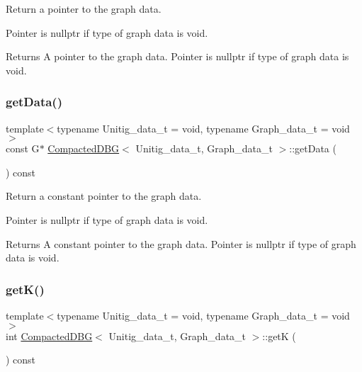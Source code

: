 Return a pointer to the graph data. 

Pointer is nullptr if type of graph data is void. \begin{DoxyReturn}{Returns}
A pointer to the graph data. Pointer is nullptr if type of graph data is void. 
\end{DoxyReturn}
\mbox{\label{classCompactedDBG_a36e0f2f8e4f46b4da147550a45bb4247}} 
\subsubsection{\texorpdfstring{get\+Data()}{getData()}\hspace{0.1cm}{\footnotesize\ttfamily [2/2]}}
{\footnotesize\ttfamily template$<$typename Unitig\+\_\+data\+\_\+t = void, typename Graph\+\_\+data\+\_\+t = void$>$ \\
const G$\ast$ \hyperlink{classCompactedDBG}{Compacted\+D\+BG}$<$ Unitig\+\_\+data\+\_\+t, Graph\+\_\+data\+\_\+t $>$\+::get\+Data (\begin{DoxyParamCaption}{ }\end{DoxyParamCaption}) const\hspace{0.3cm}{\ttfamily [inline]}}



Return a constant pointer to the graph data. 

Pointer is nullptr if type of graph data is void. \begin{DoxyReturn}{Returns}
A constant pointer to the graph data. Pointer is nullptr if type of graph data is void. 
\end{DoxyReturn}
\mbox{\label{classCompactedDBG_adbc36fa6e978151d41b259d09443cf97}} 
\subsubsection{\texorpdfstring{get\+K()}{getK()}}
{\footnotesize\ttfamily template$<$typename Unitig\+\_\+data\+\_\+t = void, typename Graph\+\_\+data\+\_\+t = void$>$ \\
int \hyperlink{classCompactedDBG}{Compacted\+D\+BG}$<$ Unitig\+\_\+data\+\_\+t, Graph\+\_\+data\+\_\+t $>$\+::getK (\begin{DoxyParamCaption}{ }\end{DoxyParamCaption}) const\hspace{0.3cm}{\ttfamily [inline]}}



